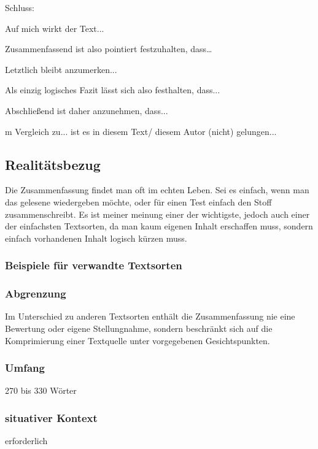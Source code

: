 Schluss:
\begin{compactitem}
    \item  Auf mich wirkt der Text... 
    \item  Zusammenfassend ist also pointiert festzuhalten, dass… 
    \item Letztlich bleibt anzumerken... 
    \item Als einzig logisches Fazit lässt sich also festhalten, dass...
    \item Abschließend ist daher anzunehmen, dass... 
    \item m Vergleich zu... ist es in diesem Text/ diesem Autor (nicht) gelungen... 
\end{compactitem}

\subsection{Realitätsbezug}
Die Zusammenfassung findet man oft im echten Leben. Sei es einfach, wenn man das gelesene wiedergeben möchte, oder für einen Test einfach den Stoff zusammenschreibt. Es ist meiner meinung einer der wichtigste, jedoch auch einer der einfachsten Textsorten, da man kaum eigenen Inhalt erschaffen muss, sondern einfach vorhandenen Inhalt logisch kürzen muss. 

\subsubsection{Beispiele für verwandte Textsorten}
\subsubsection{Abgrenzung} Im Unterschied zu anderen Textsorten enthält die Zusammenfassung
nie eine Bewertung oder eigene Stellungnahme, sondern beschränkt
sich auf die Komprimierung einer Textquelle unter vorgegebenen
Gesichtspunkten.
\subsubsection{Umfang} 270 bis 330 Wörter
\subsubsection{situativer Kontext} erforderlich